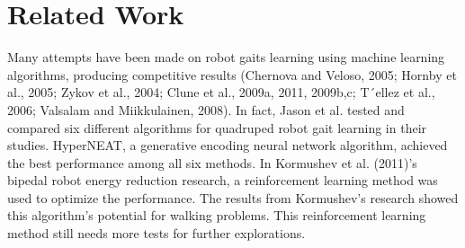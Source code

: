 \section{Related Work}

Many attempts have been made on robot gaits learning using machine
learning algorithms, producing competitive results (Chernova and Veloso, 2005; Hornby et al., 2005;
Zykov et al., 2004; Clune et al., 2009a, 2011, 2009b,c; T´ellez et
al., 2006; Valsalam and Miikkulainen, 2008). In fact, Jason et
al. tested and compared six different algorithms for quadruped robot
gait learning in their studies. HyperNEAT, a generative encoding
neural network algorithm, achieved the best performance among all six
methods. In Kormushev et al. (2011)'s bipedal robot energy reduction
research, a reinforcement learning method was used to optimize the
performance. The results from Kormushev's research showed this
algorithm's potential for walking problems. This reinforcement
learning method still needs more tests for further explorations.
